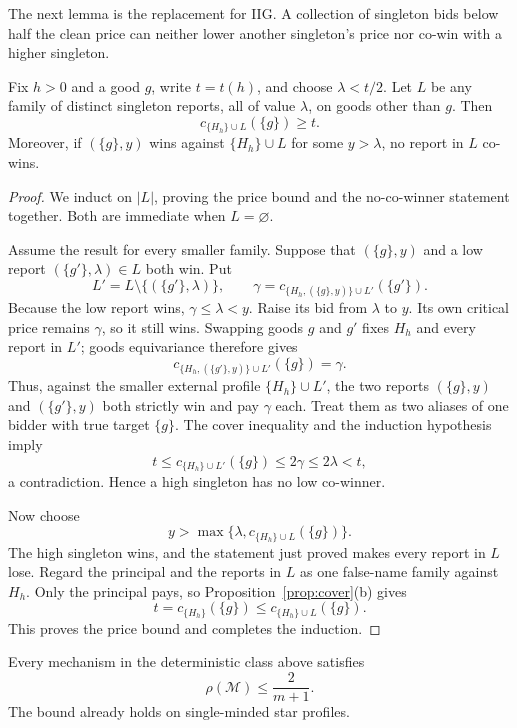 \documentclass[format=acmsmall, review=false]{acmart}
\theoremstyle{acmdefinition}%
\begin{document}
The next lemma is the replacement for IIG.  A collection of singleton bids
below half the clean price can neither lower another singleton's price nor
co-win with a higher singleton.

\begin{lemma}
\label{lem:no-iig-half}
Fix $h>0$ and a good $g$, write $t=t(h)$, and choose $\lambda<t/2$.  Let $L$
be any family of distinct singleton reports, all of value $\lambda$, on goods
other than $g$.  Then
\begin{equation}
  c_{\{H_h\}\cup L}(\{g\})\ge t.
  \label{eq:no-iig-half}
\end{equation}
Moreover, if $(\{g\},y)$ wins against $\{H_h\}\cup L$ for some $y>\lambda$, no
report in $L$ co-wins.
\end{lemma}

\begin{proof}
We induct on $|L|$, proving the price bound and the no-co-winner statement
together.  Both are immediate when $L=\varnothing$.

Assume the result for every smaller family.  Suppose that $(\{g\},y)$ and a
low report $(\{g'\},\lambda)\in L$ both win.  Put
\[
  L'=L\setminus\{(\{g'\},\lambda)\},
  \qquad
  \gamma=c_{\{H_h,(\{g\},y)\}\cup L'}(\{g'\}).
\]
Because the low report wins, $\gamma\le\lambda<y$.  Raise its bid from
$\lambda$ to $y$.
Its own critical price remains $\gamma$, so it still wins.  Swapping goods
$g$ and $g'$ fixes $H_h$ and every report in $L'$; goods equivariance
therefore gives
\[
  c_{\{H_h,(\{g'\},y)\}\cup L'}(\{g\})=\gamma.
\]
Thus, against the smaller external profile $\{H_h\}\cup L'$, the two reports
$(\{g\},y)$ and $(\{g'\},y)$ both strictly win and pay $\gamma$ each.  Treat
them as two aliases of one bidder with true target $\{g\}$.  The cover
inequality and the induction hypothesis imply
\[
  t
  \le c_{\{H_h\}\cup L'}(\{g\})
  \le 2\gamma
  \le 2\lambda
  <t,
\]
a contradiction.  Hence a high singleton has no low co-winner.

Now choose
\[
  y>\max\{\lambda,c_{\{H_h\}\cup L}(\{g\})\}.
\]
The high singleton wins, and the statement just proved makes every report in
$L$ lose.  Regard the principal and the reports in $L$ as one false-name
family against $H_h$.  Only the principal pays, so
Proposition~\ref{prop:cover}(b) gives
\[
  t=c_{\{H_h\}}(\{g\})
  \le c_{\{H_h\}\cup L}(\{g\}).
\]
This proves the price bound and completes the induction.
\end{proof}

\begin{theorem}
\label{thm:no-iig-upper}
Every mechanism in the deterministic class above satisfies
\[
  \rho(\mathcal M)\le\frac{2}{m+1}.
\]
The bound already holds on single-minded star profiles.
\end{theorem}
\end{document}
